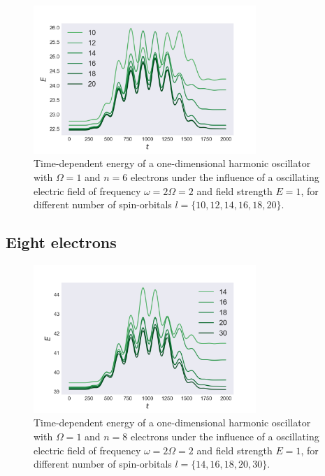 \begin{figure}[!h]
    \centering
    \includegraphics[width=0.75\textwidth]{results/figures/1D/n=6energy.png} 
    \caption{Time-dependent energy of a one-dimensional harmonic oscillator with $\Omega=1$
        and $n=6$ electrons under the influence of a oscillating electric field 
        of frequency $\omega = 2 \Omega = 2$ and field strength $E=1$, for different 
        number of spin-orbitals $l=\{10,12,14,16,18,20\}$.
    }
    \label{fig:1d_n6_qd}
\end{figure}

\subsection*{Eight electrons}

\begin{figure}[!h]
    \centering
    \includegraphics[width=0.75\textwidth]{results/figures/1D/n=8energy.png} 
    \caption{Time-dependent energy of a one-dimensional harmonic oscillator with $\Omega=1$
        and $n=8$ electrons under the influence of a oscillating electric field 
        of frequency $\omega = 2 \Omega = 2$ and field strength $E=1$, for different 
        number of spin-orbitals $l=\{14,16,18,20,30\}$.
    }
    \label{fig:1d_n8_qd}
\end{figure}

